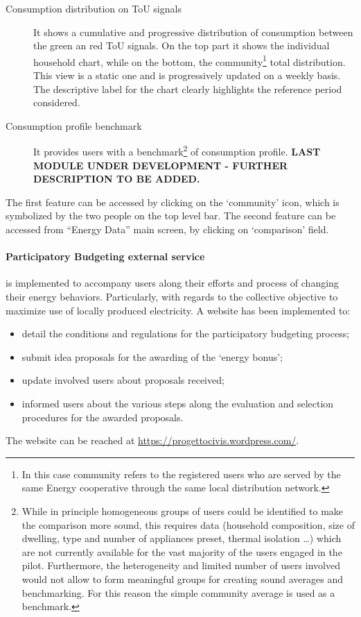 \begin{description}
 \item[Consumption distribution on ToU signals] It shows a cumulative and progressive distribution of consumption between the green an red ToU signals.
 On the top part it shows the individual household chart, while on the bottom, the community\footnote{In this case community refers to the registered users who 
 are served by the same Energy cooperative through the same local distribution network.} total distribution. This view is a static one and is progressively updated on a weekly basis. The descriptive label for the chart clearly highlights the reference period considered.
 \item[Consumption profile benchmark] It provides users with a benchmark\footnote{While in principle homogeneous groups of users could be identified to make the comparison more sound, this requires data (household composition, size of dwelling, type and number of appliances preset, thermal isolation \ldots) which are not currently available for the vast majority of the users engaged in the pilot.
 Furthermore, the heterogeneity and limited number of users involved would not allow to form meaningful groups for creating sound averages and benchmarking. For this reason the simple community average is used as a benchmark.} of consumption profile. \textbf{LAST MODULE UNDER DEVELOPMENT - FURTHER DESCRIPTION TO BE ADDED.}
\end{description}
The first feature can be accessed by clicking on the `community' icon, which is symbolized by the two people on the top level bar.
The second feature can be accessed from ``Energy Data'' main screen, by clicking on `comparison' field.

\paragraph{Participatory Budgeting external service} is implemented to accompany users along their efforts and process of changing their energy behaviors.
Particularly, with regards to the collective objective to maximize use of locally produced electricity. A website has been implemented to:
\begin{itemize}
 \item detail the conditions and regulations for the participatory budgeting process;
 \item submit idea proposals for the awarding of the `energy bonus';
 \item update involved users about proposals received;
 \item informed users about the various steps along the evaluation and selection procedures for the awarded proposals. 
\end{itemize}
The website can be reached at \url{https://progettocivis.wordpress.com/}.

\clearpage
%